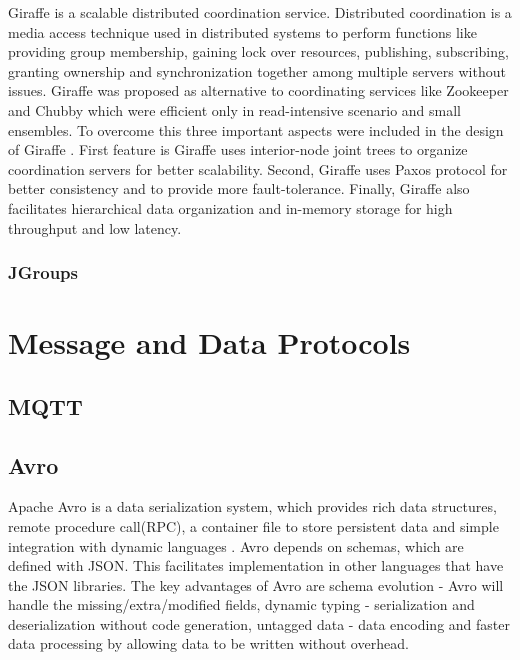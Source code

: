      Giraffe is a scalable distributed coordination
     service. Distributed coordination is a media access technique
     used in distributed systems to perform functions like providing
     group membership, gaining lock over resources, publishing,
     subscribing, granting ownership and synchronization together
     among multiple servers without issues. Giraffe was proposed as
     alternative to coordinating services like Zookeeper and Chubby
     which were efficient only in read-intensive scenario and small
     ensembles. To overcome this three important aspects were included
     in the design of Giraffe \cite{giraffePaper}. First feature is
     Giraffe uses interior-node joint trees to organize coordination
     servers for better scalability. Second, Giraffe uses Paxos
     protocol for better consistency and to provide more
     fault-tolerance. Finally, Giraffe also facilitates hierarchical
     data organization and in-memory storage for high throughput and
     low latency.
     
\subsubsection{JGroups}

\section{Message and Data Protocols}
\label{S:o-protocols}

\subsection{MQTT}

\subsection{Avro}

     Apache Avro is a data serialization system, which provides rich
     data structures, remote procedure call(RPC), a container file to
     store persistent data and simple integration with dynamic
     languages \cite{www-Avro}.  Avro depends on schemas, which are
     defined with JSON. This facilitates implementation in other
     languages that have the JSON libraries.  The key advantages of
     Avro are schema evolution - Avro will handle the
     missing/extra/modified fields, dynamic typing - serialization and
     deserialization without code generation, untagged data - data
     encoding and faster data processing by allowing data to be
     written without overhead.
     
